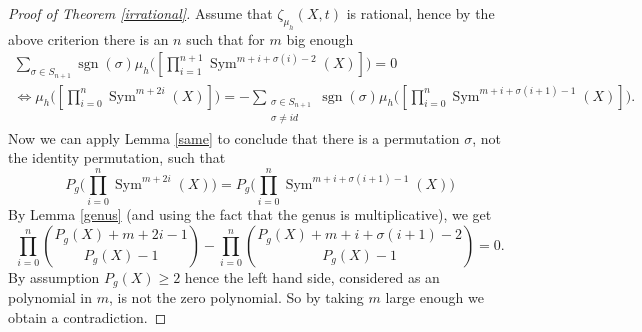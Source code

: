 \documentclass[11pt, a4paper, german, twoside]{article}
\theoremstyle{plain}
\theoremstyle{definition}
\DeclareMathOperator{\Sym}{Sym}
\DeclareMathOperator{\sgn}{sgn}
\begin{document}
\begin{proof}[Proof of Theorem \ref{irrational}]
    Assume that $\zeta_{\mu_h}(X,t)$ is rational, hence by the above criterion there is an $n$ such that for $m$ big enough
    \begin{gather*}
        \sum_{\sigma \in S_{n+1}} \sgn(\sigma) \mu_h \Big(\left[ \prod_{i=1}^{n+1} \Sym^{m + i + \sigma(i) - 2}(X)\right]\Big)  = 0 \\ 
            \Leftrightarrow
            \mu_h \Big ( \left[ \prod_{i=0}^n \Sym^{m + 2i}(X) \right] \Big )  = - \sum_{\substack{\sigma \in S_{n+1} \\ \sigma \neq id}} 
            \sgn(\sigma) \mu_h \Big ( \left[\prod_{i=0}^n \Sym^{m + i + \sigma(i+1) - 1}(X) \right]\Big ).
    \end{gather*}
    Now we can apply Lemma \ref{same} to conclude that there is a permutation $\sigma$, not the identity permutation, such that
    \[
        P_g \Big(\prod_{i=0}^n \Sym^{m+2i}(X)\Big) = P_g \Big( \prod_{i=0}^n \Sym^{m+i+\sigma(i+1) - 1}(X) \Big)
    \]
    By Lemma \ref{genus} (and using the fact that the genus is multiplicative), we get
    \[
        \prod_{i=0}^n \binom{P_g(X) + m + 2i - 1}{P_g(X) - 1} - \prod_{i=0}^n \binom{P_g(X) + m + i + \sigma(i+1) - 2}{P_g(X) - 1} = 0.
    \]
    By assumption $P_g(X) \geq 2$ hence the left hand side, considered as an polynomial in $m$, is not the zero polynomial. So by taking
    $m$ large enough we obtain a contradiction.
\end{proof}

{}

\end{document}

